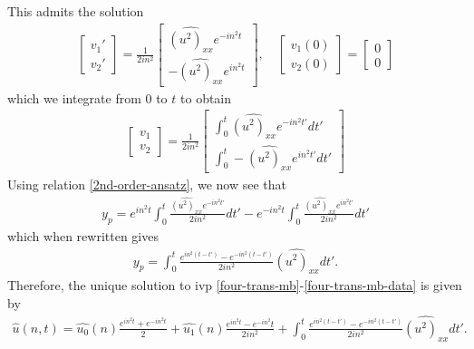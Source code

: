 \documentclass[12pt,reqno]{amsart}
\numberwithin{equation}{section}  %
\numberwithin{figure}{section}
\newcommand{\wh}{\widehat}
\theoremstyle{plain}
\theoremstyle{definition}
\theoremstyle{remark}
\begin{document}
This admits the solution
\begin{gather*}
    \begin{bmatrix}
      v_{1}' \\
      v_{2}'
    \end{bmatrix}
    =
    \frac{1}{2in^{2}}
    \begin{bmatrix}
      \wh{(u^{2})_{xx}}e^{-in^{2}t}
      \\
      -\wh{(u^{2})_{xx}}e^{in^{2}t}
    \end{bmatrix}, \quad
\begin{bmatrix}
      v_{1}(0) \\
      v_{2}(0)
    \end{bmatrix}
    =
    \begin{bmatrix}
    0 \\
     0
    \end{bmatrix}
\end{gather*}
which we integrate from $0$ to $t$ to obtain
\begin{gather*}
    \begin{bmatrix}
      v_{1} \\
      v_{2}
    \end{bmatrix}
    =
    \frac{1}{2in^{2}}
    \begin{bmatrix}
      \int_{0}^{t} \wh{(u^{2})_{xx}}e^{-in^{2}t'} dt'
      \\
      \int_{0}^{t} -\wh{(u^{2})_{xx}}e^{in^{2}t'} dt'
    \end{bmatrix}
\end{gather*}
Using relation \eqref{2nd-order-ansatz}, we now see that
%
%
\begin{equation*}
\begin{split}
  y_{p}= e^{in^{2}t}\int_{0}^{t}
  \frac{\wh{(u^{2})_{xx}}e^{-in^{2}t'}}{2in^{2}} dt'
  - e^{-in^{2}t}\int_{0}^{t} \frac{\wh{(u^{2})_{xx}}e^{in^{2}t'}}{2in^{2}} dt'
\end{split}
\end{equation*}
%
%
which when rewritten gives
%
%
\begin{equation*}
\begin{split}
  y_{p}= \int_{0}^{t}\frac{e^{in^{2}(t-t')}-e^{-in^{2}(t-t')}}{2in^{2}}
  \wh{(u^{2})_{xx}} dt'.
\end{split}
\end{equation*}
%
%
Therefore, the unique solution to ivp
\eqref{four-trans-mb}-\eqref{four-trans-mb-data} is given by
%
%
\begin{equation*}
\begin{split}
\wh{u}(n, t) = \wh{u_{0}}(n) \frac{e^{in^{2}t} + e^{-in^{2}t}}{2} +
  \wh{u_{1}}(n)\frac{e^{in^{2}t} - e^{-in^{2}}t}{2 i n^{2}} +
  \int_{0}^{t}\frac{e^{in^{2}(t-t')}-e^{-in^{2}(t-t')}}{2in^{2}}
  \wh{(u^{2})_{xx}} dt'.
\end{split}
\end{equation*}
\end{document}
